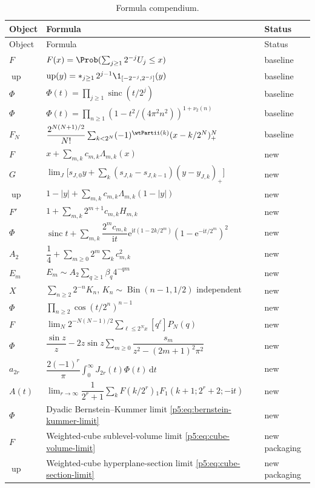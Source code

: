 \documentclass[11pt,oneside]{article}
\theoremstyle{definition}
\newcommand{\dd}{\,\mathrm d}
\newcommand{\e}{\mathrm e}
\newcommand{\ii}{\mathrm i}
\newcommand{\Up}{\operatorname{up}}
\newcommand{\sinc}{\operatorname{sinc}}
\newcommand{\vtwo}{\nu_2}
\begin{document}
\begin{longtable}{@{}p{}p{}p{}@{}}
\caption{Formula compendium.}\label{p5:tab:compendium}\\
\toprule
Object & Formula & Status\\
\midrule
\endfirsthead
\toprule
Object & Formula & Status\\
\midrule
\endhead
$F$ & $F(x)=\Prob(\sum_{j\ge1}2^{-j}U_j\le x)$ & baseline\\
$\Up$ & $\Up(y)=\mathop{\ast}_{j\ge1}2^{j-1}\1_{[-2^{-j},2^{-j}]}(y)$ & baseline\\
$\Phi$ & $\Phi(t)=\prod_{j\ge1}\sinc(t/2^j)$ & baseline\\
$\Phi$ & $\Phi(t)=\prod_{n\ge1}(1-t^2/(4\pi^2n^2))^{1+\vtwo(n)}$ & baseline\\
$F_N$ & $\dfrac{2^{N(N+1)/2}}{N!}\sum_{k<2^N}(-1)^{\wtPartii(k)}(x-k/2^N)_+^N$ & baseline\\
$F$ & $x+\sum_{m,k}c_{m,k}\Lambda_{m,k}(x)$ & new\\
$G$ & $\lim_J\bigl[s_{J,0}y+\sum_k(s_{J,k}-s_{J,k-1})(y-y_{J,k})_+\bigr]$ & new\\
$\Up$ & $1-|y|+\sum_{m,k}c_{m,k}\Lambda_{m,k}(1-|y|)$ & new\\
$F'$ & $1+\sum_{m,k}2^{m+1}c_{m,k}H_{m,k}$ & new\\
$\Phi$ & $\sinc t+\sum_{m,k}\dfrac{2^mc_{m,k}}{\ii t}\e^{\ii t(1-2k/2^m)}(1-\e^{-\ii t/2^m})^2$ & new\\
$A_2$ & $\dfrac14+\sum_{m\ge0}2^m\sum_kc_{m,k}^2$ & new\\
$E_m$ & $E_m\sim A_2\sum_{q\ge1}\beta_q4^{-qm}$ & new\\
$X$ & $\sum_{n\ge2}2^{-n}K_n$, $K_n\sim\operatorname{Bin}(n-1,1/2)$ independent & new\\
$\Phi$ & $\prod_{n\ge2}\cos(t/2^n)^{n-1}$ & new\\
$F$ & $\lim_N2^{-N(N-1)/2}\sum_{\ell\le2^Nx}[q^\ell]P_N(q)$ & new\\
$\Phi$ & $\dfrac{\sin z}{z}-2z\sin z\sum_{m\ge0}\dfrac{s_m}{z^2-(2m+1)^2\pi^2}$ & new\\
$a_{2r}$ & $\dfrac{2(-1)^r}{\pi}\int_0^\infty J_{2r}(t)\Phi(t)\dd t$ & new\\
$A(t)$ & $\lim_{r\to\infty}\dfrac1{2^r+1}\sum_kF(k/2^r){}_1F_1(k+1;2^r+2;-\ii t)$ & new\\
$\Phi$ & Dyadic Bernstein--Kummer limit \eqref{p5:eq:bernstein-kummer-limit} & new\\
$F$ & Weighted-cube sublevel-volume limit \eqref{p5:eq:cube-volume-limit} & new packaging\\
$\Up$ & Weighted-cube hyperplane-section limit \eqref{p5:eq:cube-section-limit} & new packaging\\
\bottomrule
\end{longtable}
\end{document}
